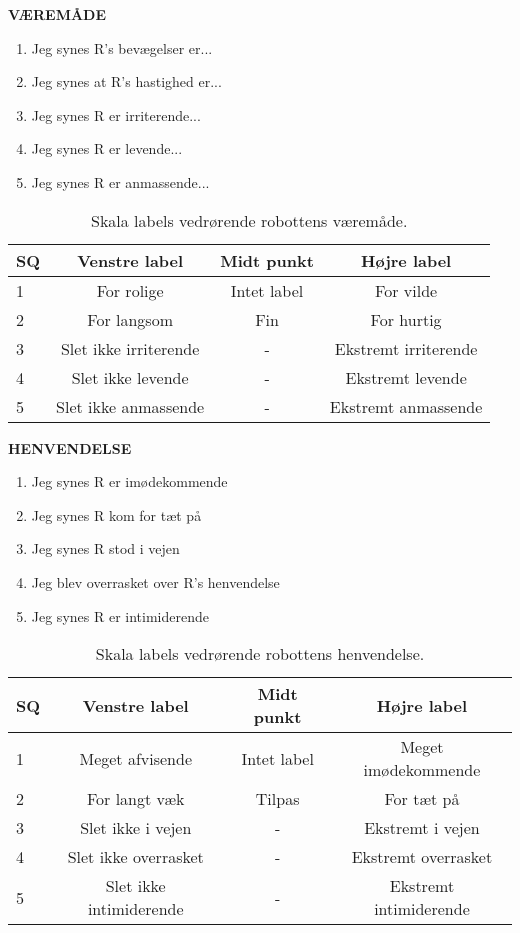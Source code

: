 \noindent
%
\textbf{VÆREMÅDE}
%
\begin{enumerate}
  \item Jeg synes R's bevægelser er...
  \item Jeg synes at R's hastighed er...
  \item Jeg synes R er irriterende...
  \item Jeg synes R er levende...
  \item Jeg synes R er anmassende...\blankline
\end{enumerate}
%
\begin{table}[H]
	\centering 
	\begin{tabular}{l|c|c|c}
		SQ     & Venstre label & Midt punkt & Højre label \\\hline
		1   & For rolige & Intet label & For vilde     \\\hline
		2   & For langsom & Fin & For hurtig   \\\hline
		3   & Slet ikke irriterende & - & Ekstremt irriterende \\\hline
	 	4   & Slet ikke levende & - & Ekstremt levende         \\\hline
		5   & Slet ikke anmassende & - & Ekstremt anmassende             
	\end{tabular}
	\caption{Skala labels vedrørende robottens væremåde.}
	\label{tab:VaeremaadeSkala}
\end{table}
\noindent
%
\textbf{HENVENDELSE}
%
\begin{enumerate}
  \item Jeg synes R er imødekommende
  \item Jeg synes R kom for tæt på
  \item Jeg synes R stod i vejen
  \item Jeg blev overrasket over R's henvendelse
  \item Jeg synes R er intimiderende\\
\end{enumerate}
%
\begin{table}[H]
	\centering
	\begin{tabular}{l|c|c|c}
		SQ     & Venstre label & Midt punkt & Højre label \\\hline
		1   & Meget afvisende & Intet label & Meget imødekommende         \\\hline
		2   & For langt væk & Tilpas & For tæt på    \\\hline
		3   & Slet ikke i vejen & -  & Ekstremt i vejen  \\\hline
	 	4   & Slet ikke overrasket &  -  & Ekstremt overrasket \\\hline
		5   & Slet ikke intimiderende & - & Ekstremt intimiderende           
	\end{tabular}
	\caption{Skala labels vedrørende robottens henvendelse.}
	\label{tab:HenvendelseSkala} 
\end{table}
